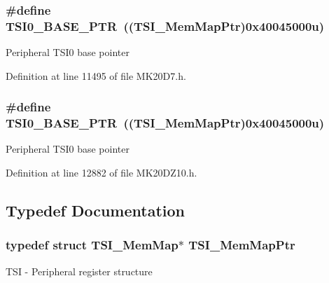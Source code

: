 \subsubsection[{\texorpdfstring{T\+S\+I0\+\_\+\+B\+A\+S\+E\+\_\+\+P\+TR}{TSI0_BASE_PTR}}]{\setlength{\rightskip}{0pt plus 5cm}\#define T\+S\+I0\+\_\+\+B\+A\+S\+E\+\_\+\+P\+TR~(({\bf T\+S\+I\+\_\+\+Mem\+Map\+Ptr})0x40045000u)}\hypertarget{group___t_s_i___peripheral_gaf98ea1cd15559446e0cfc1ae177751f6}{}\label{group___t_s_i___peripheral_gaf98ea1cd15559446e0cfc1ae177751f6}
Peripheral T\+S\+I0 base pointer 

Definition at line 11495 of file M\+K20\+D7.\+h.

\subsubsection[{\texorpdfstring{T\+S\+I0\+\_\+\+B\+A\+S\+E\+\_\+\+P\+TR}{TSI0_BASE_PTR}}]{\setlength{\rightskip}{0pt plus 5cm}\#define T\+S\+I0\+\_\+\+B\+A\+S\+E\+\_\+\+P\+TR~(({\bf T\+S\+I\+\_\+\+Mem\+Map\+Ptr})0x40045000u)}\hypertarget{group___t_s_i___peripheral_gaf98ea1cd15559446e0cfc1ae177751f6}{}\label{group___t_s_i___peripheral_gaf98ea1cd15559446e0cfc1ae177751f6}
Peripheral T\+S\+I0 base pointer 

Definition at line 12882 of file M\+K20\+D\+Z10.\+h.



\subsection{Typedef Documentation}
\subsubsection[{\texorpdfstring{T\+S\+I\+\_\+\+Mem\+Map\+Ptr}{TSI_MemMapPtr}}]{\setlength{\rightskip}{0pt plus 5cm}typedef struct {\bf T\+S\+I\+\_\+\+Mem\+Map}$\ast$ {\bf T\+S\+I\+\_\+\+Mem\+Map\+Ptr}}\hypertarget{group___t_s_i___peripheral_gad1310fedc6b594554cdd760e371de570}{}\label{group___t_s_i___peripheral_gad1310fedc6b594554cdd760e371de570}
T\+SI -\/ Peripheral register structure 
